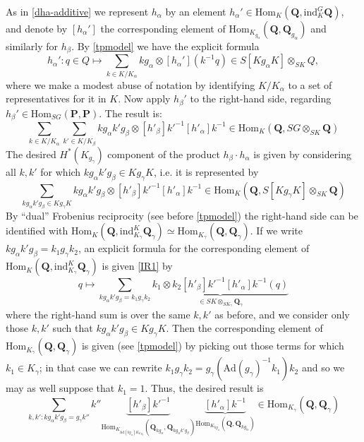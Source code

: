 \documentclass[10pt]{amsart}
\newcommand{\Ad}{\mathrm{Ad}}
\newcommand{\Hom}{\mathrm{Hom}}
\newcommand{\ind}{\mathrm{ind}}
\theoremstyle{remark}
\begin{document}
As in \eqref{dha-additive} we represent $h_{\alpha}$
 by an element  $h_{\alpha}' \in 
 \Hom_{K}(\mathbf{Q}, \ind_K^G \mathbf{Q})$,
 and denote by $[h_{\alpha}']$ the corresponding element of
 $
 \Hom_{K_{g_{\alpha}}}(\mathbf{Q}, \mathbf{Q}_{ g_{\alpha}})$
 and similarly for $h_{\beta}$.  
By \eqref{tpmodel} we have the explicit formula 
$$h_{\alpha}': q \in Q \mapsto 
 \sum_{k \in K/K_{\alpha}} k g_{\alpha} \otimes [h_{\alpha}'](k^{-1} q) \in S[K g_{\alpha} K] \otimes_{SK} Q,$$
 where we make a modest abuse of notation by identifying $K/K_{\alpha}$ to a set of representatives for it in $K$. 
 Now apply $h_{\beta}'$ to the right-hand side, regarding $h_{\beta}' \in \Hom_{SG}(\mathbf{P}, \mathbf{P})$. The result is:  
 \begin{equation} \label{bigmess} 
 \sum_{k \in K/K_{\alpha}}  \sum_{k' \in K/K_{\beta}} k g_{\alpha} k' g_{\beta} \otimes  [h'_{\beta}] k'^{-1} [h'_{\alpha}] k^{-1}  
 \in \Hom_{K} (\mathbf{Q}, SG \otimes_{SK} \mathbf{Q})\end{equation}
The desired  
 $H^*(K_{g_{\gamma}})$ component of the product $h_{\beta} \cdot h_{\alpha}$  is given by 
 considering all $k,k'$ for which $k g_{\alpha} k' g_{\beta} \in K g_{\gamma} K$, i.e. it is represented by 
 \begin{equation} \label{bigmess2} 
 \sum_{k g_{\alpha} k' g_{\beta} \in K g_{\gamma} K } k g_{\alpha} k' g_{\beta} \otimes  [h'_{\beta}] k'^{-1} [h'_{\alpha}] k^{-1}  
 \in \Hom_{K} (\mathbf{Q}, S[K g_{\gamma} K] \otimes_{SK} \mathbf{Q})\end{equation}
By ``dual'' Frobenius reciprocity (see before
\eqref{tpmodel})
the right-hand side  can be identified with $\Hom_{K}(\mathbf{Q}, \ind^K_{K_{\gamma}} \mathbf{Q}_{\gamma}) \simeq \Hom_{K_{\gamma}}(\mathbf{Q}, \mathbf{Q}_{\gamma})$.
If we write $kg_{\alpha} k' g_{\beta} = k_1 g_{\gamma} k_2$, an explicit formula for the corresponding
   element of  $\Hom_{K}(\mathbf{Q}, \ind^K_{K_{\gamma}} \mathbf{Q}_{\gamma})$ is given \eqref{IR1} by
$$q \mapsto  \sum_{k g_{\alpha} k' g_{\beta} = k_1 g_{\gamma} k_2 }  \underbrace{k_1 \otimes k_2 [h'_{\beta}] k'^{-1} [h'_{\alpha}] k^{-1} (q) }_{\in SK \otimes_{S K_{\gamma}} \mathbf{Q}_{\gamma}}
 $$
 where the right-hand sum is over the same $k, k'$ as before, and we consider only those $k,k'$ such that $kg_{\alpha} k' g_{\beta}  \in K g_{\gamma} K$. 
Then the corresponding  element of $\Hom_{K_{\gamma}}(\mathbf{Q}, \mathbf{Q}_{\gamma})$
 is given (see \eqref{tpmodel})  by picking out those terms for which $k_1 \in K_{\gamma}$; in that case we 
 can rewrite $k_1 g_{\gamma} k_2 = g_{\gamma} (\Ad(g_{\gamma})^{-1} k_1) k_2$ and so 
we may as well suppose that $k_1 = 1$. Thus, 
 the desired result is 
\begin{equation} \label{finale}  \sum_{k, k': k g_{\alpha} k' g_{\beta} =  g_{\gamma} k''}  k''   \underbrace{[h'_{\beta}] k'^{-1}}_{\Hom_{K_{\Ad(k g_{\alpha}) K_{k' g_{\beta}}}}(\mathbf{Q}_{k g_{\alpha}}, \mathbf{Q}_{k g_{\alpha} k' g_{\beta}}) }  \underbrace{ [h'_{\alpha}] k^{-1}}_{\Hom_{K_{kg_{\alpha}}}(\mathbf{Q}, \mathbf{Q}_{k g_{\alpha}}) }\in \Hom_{K_{\gamma}}(\mathbf{Q},\mathbf{Q}_{\gamma}) \end{equation} 
 
\end{document}
